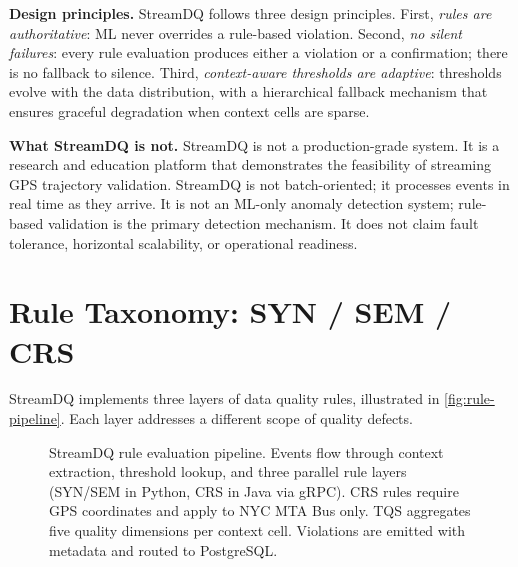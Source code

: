 \textbf{Design principles.} StreamDQ follows three design principles.
First, \textit{rules are authoritative}: ML never overrides a rule-based
violation. Second, \textit{no silent failures}: every rule evaluation
produces either a violation or a confirmation; there is no fallback to
silence. Third, \textit{context-aware thresholds are adaptive}: thresholds
evolve with the data distribution, with a hierarchical fallback mechanism
that ensures graceful degradation when context cells are sparse.

\textbf{What StreamDQ is not.} StreamDQ is not a production-grade system.
It is a research and education platform that demonstrates the feasibility of
streaming GPS trajectory validation. StreamDQ is not batch-oriented;
it processes events in real time as they arrive. It is not an ML-only
anomaly detection system; rule-based validation is the primary detection
mechanism. It does not claim fault tolerance, horizontal scalability, or
operational readiness.

\section{Rule Taxonomy: SYN / SEM / CRS}
\label{sec:rule-taxonomy}

StreamDQ implements three layers of data quality rules, illustrated in
\autoref{fig:rule-pipeline}. Each layer addresses a different scope of
quality defects.

\begin{figure}[htbp]
  \centering
  \caption{StreamDQ rule evaluation pipeline. Events flow through context
    extraction, threshold lookup, and three parallel rule layers (SYN/SEM in
    Python, CRS in Java via gRPC). CRS rules require GPS coordinates and apply
    to NYC MTA Bus only. TQS aggregates five quality dimensions per context
    cell. Violations are emitted with metadata and routed to PostgreSQL.}
  \label{fig:rule-pipeline}
\end{figure}

